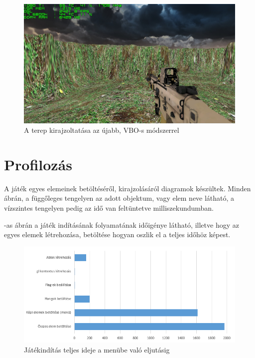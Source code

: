 \begin{figure}[h]
\centering
\includegraphics[scale=0.35]{kepek/vbo_method_fps.png}
\caption{A terep kirajzoltatása az újabb, VBO-s módszerrel}
\label{fig:vbo_fps}
\end{figure}

\section{Profilozás}

A játék egyes elemeinek betöltéséről, kirajzolásáról diagramok készültek. Minden ábrán, a függőleges tengelyen az adott objektum, vagy elem neve látható, a vízszintes tengelyen pedig az idő van feltüntetve milliszekundumban.

-as ábrán a játék indításának folyamatának időigénye látható, illetve hogy az egyes elemek létrehozása, betöltése hogyan oszlik el a teljes időhöz képest.

\begin{figure}[h]
\centering
\includegraphics[scale=0.84]{kepek/start_diag.png}
\caption{Játékindítás teljes ideje a menübe való eljutásig}
\label{fig:start_diag}
\end{figure}

